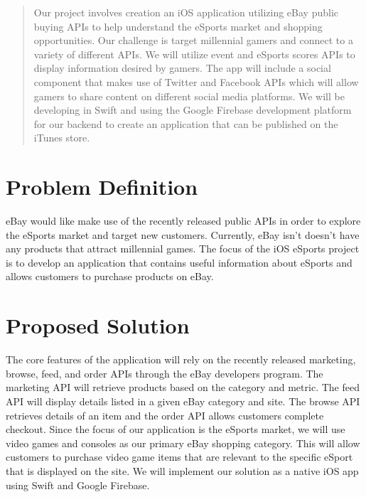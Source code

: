 \documentclass[onecolumn, draftclsnofoot,10pt, compsoc]{IEEEtran}
\begin{document}
\begin{titlepage}
\begin{singlespace}
\begin{abstract}
        Our project involves creation an iOS application utilizing eBay public buying APIs to help understand the eSports market and shopping opportunities. 
        Our challenge is target millennial gamers and connect to a variety of different APIs. 
        We will utilize event and eSports scores APIs to display information desired by gamers. 
        The app will include a social component that makes use of Twitter and Facebook APIs which will allow gamers to share content on different social media platforms. 
        We will be developing in Swift and using the Google Firebase development platform for our backend to create an application that can be published on the iTunes store. 
        
        \end{abstract}     
    \end{singlespace}
\end{titlepage}
\newpage
{}
\tableofcontents
\clearpage

\section{Problem Definition}
eBay would like make use of  the recently released public APIs in order to explore the eSports market and target new customers. 
Currently, eBay isn’t doesn’t have any products that attract millennial games. 
The focus of the iOS eSports project is to develop an application that contains useful information about eSports and allows customers to purchase products on eBay. 

\section{Proposed Solution}
The core features of the application will rely on the recently released marketing, browse, feed, and order APIs through the eBay developers program. 
The marketing API will retrieve products based on the category and metric. 
The feed API will display details listed in a given eBay category and site. 
The browse API retrieves details of an item and the order API allows customers complete checkout. 
Since the focus of our application is the eSports market, we will use video games and consoles as our primary eBay shopping category. 
This will allow customers to purchase video game items that are relevant to the specific eSport that is displayed on the site. 
We will implement our solution as a native iOS app using Swift and Google Firebase. 
\end{document}
